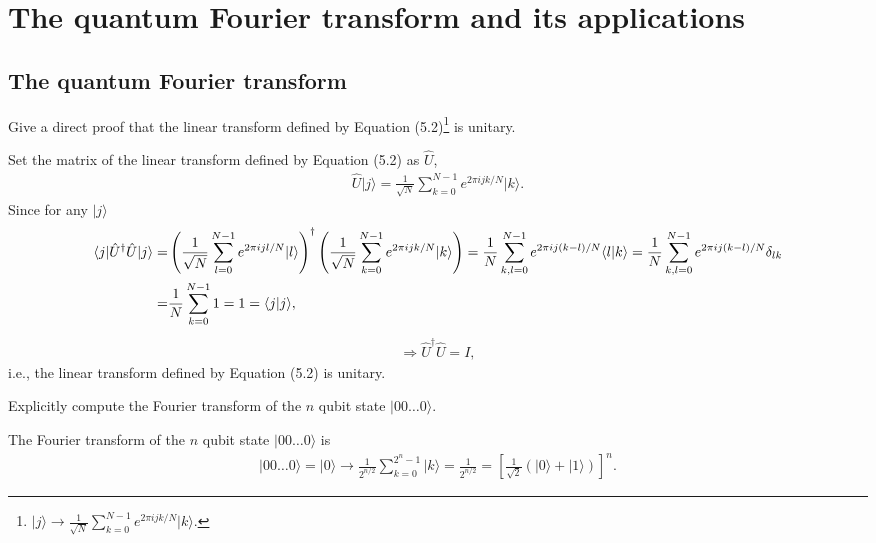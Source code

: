 \documentclass[en]{sol-man}
\begin{document}
\fi
\chapter{The quantum Fourier transform and its applications}

\section{The quantum Fourier transform}

\begin{exe}
    Give a direct proof that the linear transform defined by Equation (5.2)\footnote{\label{Equ-5.2}$\lvert j\rangle\longrightarrow\frac{1}{\sqrt{N}}\sum_{k=0}^{N-1}e^{2\pi ijk/N}\lvert k\rangle$.} is unitary.
\end{exe}
\begin{pf}
    Set the matrix of the linear transform defined by Equation (5.2) as $\hat{U}$,
    \begin{align}
        \hat{U}\lvert j\rangle=\frac{1}{\sqrt{N}}\sum_{k=0}^{N-1}e^{2\pi ijk/N}\lvert k\rangle.
    \end{align}
    Since for any $\lvert j\rangle$
    \begin{align}
        \notag\langle j\rvert\hat{U}^{\dagger}\hat{U}\lvert j\rangle=&\left(\frac{1}{\sqrt{N}}\sum_{l=0}^{N-1}e^{2\pi ijl/N}\lvert l\rangle\right)^{\dagger}\left(\frac{1}{\sqrt{N}}\sum_{k=0}^{N-1}e^{2\pi ijk/N}\lvert k\rangle\right)=\frac{1}{N}\sum_{k,l=0}^{N-1}e^{2\pi ij(k-l)/N}\langle l\vert k\rangle=\frac{1}{N}\sum_{k,l=0}^{N-1}e^{2\pi ij(k-l)/N}\delta_{lk}\\
        =&\frac{1}{N}\sum_{k=0}^{N-1}1=1=\langle j\vert j\rangle,
    \end{align}
    \begin{align}
        \Longrightarrow\hat{U}^{\dagger}\hat{U}=I,
    \end{align}
    i.e., the linear transform defined by Equation (5.2) is unitary.
\end{pf}

\begin{exe}
    Explicitly compute the Fourier transform of the $n$ qubit state $\lvert 00\dots 0\rangle$.
\end{exe}
\begin{sol}
    The Fourier transform of the $n$ qubit state $\lvert 00\dots 0\rangle$ is
    \begin{align}
        \lvert 00\dots 0\rangle=\lvert 0\rangle\longrightarrow\frac{1}{2^{n/2}}\sum_{k=0}^{2^n-1}\lvert k\rangle=\frac{1}{2^{n/2}}=\left[\frac{1}{\sqrt{2}}(\lvert 0\rangle+\lvert 1\rangle)\right]^n.
    \end{align}
\end{sol}
\end{document}

